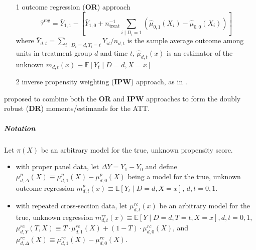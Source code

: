 \documentclass[twoside]{article}
\begin{document}
\begin{itemize}
    \item[1] outcome regression (\textbf{OR}) approach
    \begin{equation*}
        \hat{\tau}^{\mathrm{reg}} = \bar{Y}_{1,1}-\left[ \bar{Y}_{1,0} + n^{-1}_{\mathrm{treat}} \sum_{i\mid D_i=1}\left(\hat{\mu}_{0,1}\left(X_i\right) - \hat{\mu}_{0,0}\left(X_i\right) \right) \right]
    \end{equation*}
    where $\bar{Y}_{d,t}= \sum_{i\mid D_i=d,T_i=t}Y_{it}/n_{d,t}$ is the sample average outcome among units in treatment group $d$ and time $t$, $\hat{\mu}_{d,t}(x)$ is an estimator of the unknown $m_{d,t}(x)\equiv \mathbb{E}\left[Y_t\mid D=d,X=x\right]$
    \item[2] inverse propensity weighting (\textbf{IPW}) approach, as in \citet{abadie2005semiparametric}.
\end{itemize}

\citet{sant2020doubly} proposed to combine both the \textbf{OR} and \textbf{IPW} approaches to form the doubly robust (\textbf{DR}) moments/estimands for the ATT.

\subparagraph*{Notation} Let $\pi(X)$ be an arbitrary model for the true, unknown propensity score.
\begin{itemize}
    \item with proper panel data, let $\Delta Y= Y_1-Y_0$ and define $\mu^p_{d,\Delta}(X)\equiv \mu^p_{d,1}(X)-\mu^p_{d,0}(X)$ being a model for the true, unknown outcome regression $m^p_{d,t}(x)\equiv \mathbb{E}\left[Y_t\mid D=d,X=x\right]$, $d,t=0,1$. 
    \item with repeated cross-section data, let $\mu_{d,t}^{rc}(x)$ be an arbitrary model for the true, unknown regression $m^{rc}_{d,t}(x)\equiv \mathbb{E}\left[Y\mid D=d,T=t,X=x\right], d,t=0,1$, $\mu_{d,Y}^{rc}(T,X)\equiv T\cdot \mu^{rc}_{d,1}(X)+(1-T)\cdot \mu^{rc}_{d,0}(X)$, and $\mu^{rc}_{d,\Delta}(X)\equiv \mu^{rc}_{d,1}(X)-\mu^{rc}_{d,0}(X)$.
\end{itemize}
\end{document}

